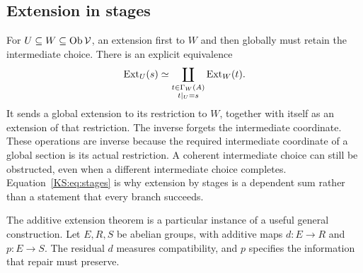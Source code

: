 \subsection{Extension in stages}
For \(U\subseteq W\subseteq\operatorname{Ob}\mathcal V\), an extension first to \(W\) and then globally must retain the intermediate choice. There is an explicit equivalence
\begin{equation}\label{KS:eq:stages}
 \operatorname{Ext}_U(s)\simeq
 \coprod_{\substack{t\in\Gamma_W(A)\\t|_U=s}}\operatorname{Ext}_W(t).
\end{equation}
It sends a global extension to its restriction to \(W\), together with itself as an extension of that restriction. The inverse forgets the intermediate coordinate. These operations are inverse because the required intermediate coordinate of a global section is its actual restriction. A coherent intermediate choice can still be obstructed, even when a different intermediate choice completes. Equation~\eqref{KS:eq:stages} is why extension by stages is a dependent sum rather than a statement that every branch succeeds.

\label{KS:sec:protected}
The additive extension theorem is a particular instance of a useful general construction. Let \(E,R,S\) be abelian groups, with additive maps \(d:E\to R\) and \(p:E\to S\). The residual \(d\) measures compatibility, and \(p\) specifies the information that repair must preserve.

